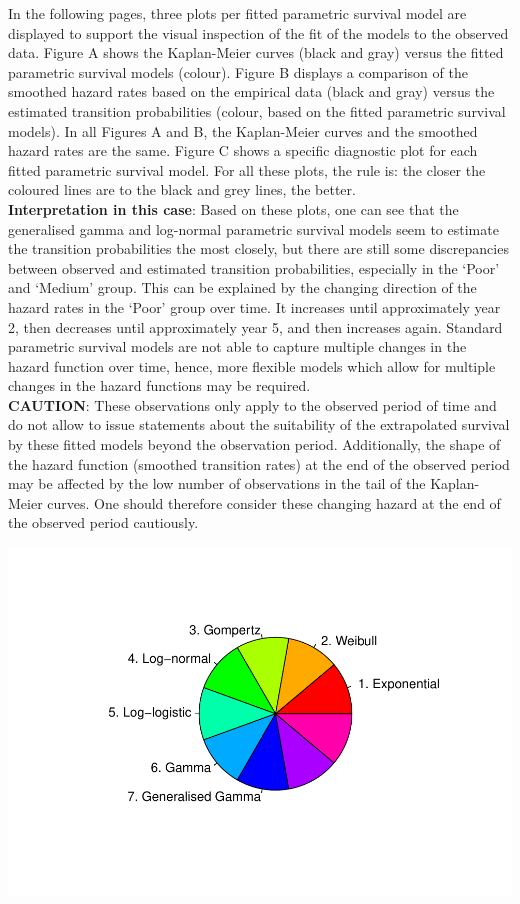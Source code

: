 \documentclass[
]{article}
\begin{document}
In the following pages, three plots per fitted parametric survival model
are displayed to support the visual inspection of the fit of the models
to the observed data. Figure A shows the Kaplan-Meier curves (black and
gray) versus the fitted parametric survival models (colour). Figure B
displays a comparison of the smoothed hazard rates based on the
empirical data (black and gray) versus the estimated transition
probabilities (colour, based on the fitted parametric survival models).
In all Figures A and B, the Kaplan-Meier curves and the smoothed hazard
rates are the same. Figure C shows a specific diagnostic plot for each
fitted parametric survival model. For all these plots, the rule is: the
closer the coloured lines are to the black and grey lines, the better.\\
\textbf{Interpretation in this case}: Based on these plots, one can see
that the generalised gamma and log-normal parametric survival models
seem to estimate the transition probabilities the most closely, but
there are still some discrepancies between observed and estimated
transition probabilities, especially in the `Poor' and `Medium' group.
This can be explained by the changing direction of the hazard rates in
the `Poor' group over time. It increases until approximately year 2,
then decreases until approximately year 5, and then increases again.
Standard parametric survival models are not able to capture multiple
changes in the hazard function over time, hence, more flexible models
which allow for multiple changes in the hazard functions may be
required.\\
\textbf{CAUTION}: These observations only apply to the observed period
of time and do not allow to issue statements about the suitability of
the extrapolated survival by these fitted models beyond the observation
period. Additionally, the shape of the hazard function (smoothed
transition rates) at the end of the observed period may be affected by
the low number of observations in the tail of the Kaplan-Meier curves.
One should therefore consider these changing hazard at the end of the
observed period cautiously.

\begin{flushleft}\includegraphics{Images/plot_parametric-1} \end{flushleft}
\end{document}
